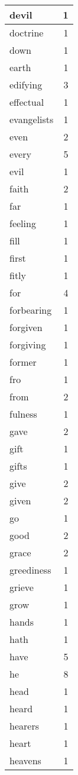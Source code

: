 \begin{center}
\begin{longtable}{l|r}
devil & 1\\ \hline 
doctrine & 1\\ \hline 
down & 1\\ \hline 
earth & 1\\ \hline 
edifying & 3\\ \hline 
effectual & 1\\ \hline 
evangelists & 1\\ \hline 
even & 2\\ \hline 
every & 5\\ \hline 
evil & 1\\ \hline 
faith & 2\\ \hline 
far & 1\\ \hline 
feeling & 1\\ \hline 
fill & 1\\ \hline 
first & 1\\ \hline 
fitly & 1\\ \hline 
for & 4\\ \hline 
forbearing & 1\\ \hline 
forgiven & 1\\ \hline 
forgiving & 1\\ \hline 
former & 1\\ \hline 
fro & 1\\ \hline 
from & 2\\ \hline 
fulness & 1\\ \hline 
gave & 2\\ \hline 
gift & 1\\ \hline 
gifts & 1\\ \hline 
give & 2\\ \hline 
given & 2\\ \hline 
go & 1\\ \hline 
good & 2\\ \hline 
grace & 2\\ \hline 
greediness & 1\\ \hline 
grieve & 1\\ \hline 
grow & 1\\ \hline 
hands & 1\\ \hline 
hath & 1\\ \hline 
have & 5\\ \hline 
he & 8\\ \hline 
head & 1\\ \hline 
heard & 1\\ \hline 
hearers & 1\\ \hline 
heart & 1\\ \hline 
heavens & 1\\ \hline 

\end{longtable}
\end{center}
